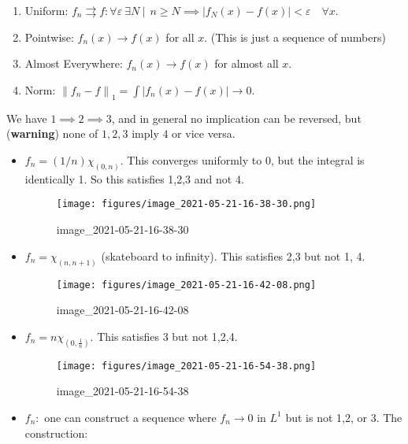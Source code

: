 \begin{proposition}

\envlist

\begin{enumerate}
\def\labelenumi{\arabic{enumi}.}
\tightlist
\item
  Uniform:
  \(f_n \rightrightarrows f: \forall \varepsilon ~\exists N {~\mathrel{\Big|}~}~n\geq N \implies {\left\lvert {f_N(x) - f(x)} \right\rvert} < \varepsilon \quad \forall x.\)
\item
  Pointwise: \(f_n(x) \to f(x)\) for all \(x\). (This is just a sequence
  of numbers)
\item
  Almost Everywhere: \(f_n(x) \to f(x)\) for almost all \(x\).
\item
  Norm:
  \({\left\lVert {f_n - f} \right\rVert}_1 = \int {\left\lvert {f_n(x) - f(x)} \right\rvert} \to 0\).
\end{enumerate}

We have \(1 \implies 2 \implies 3\), and in general no implication can
be reversed, but (\textbf{warning}) none of \(1,2,3\) imply \(4\) or
vice versa.

\begin{itemize}
\item
  \(f_n = (1/n) \chi_{(0, n)}\). This converges uniformly to 0, but the
  integral is identically 1. So this satisfies 1,2,3 and not 4.

  \begin{figure}
  \centering
  \texttt{[image: figures/image\_2021-05-21-16-38-30.png]}
  \caption{image\_2021-05-21-16-38-30}
  \end{figure}
\item
  \(f_n = \chi_{(n, n+1)}\) (skateboard to infinity). This satisfies 2,3
  but not 1, 4.

  \begin{figure}
  \centering
  \texttt{[image: figures/image\_2021-05-21-16-42-08.png]}
  \caption{image\_2021-05-21-16-42-08}
  \end{figure}
\item
  \(f_n = n\chi_{(0, \frac 1 n)}\). This satisfies 3 but not 1,2,4.

  \begin{figure}
  \centering
  \texttt{[image: figures/image\_2021-05-21-16-54-38.png]}
  \caption{image\_2021-05-21-16-54-38}
  \end{figure}
\item
  \(f_n:\) one can construct a sequence where \(f_n \to 0\) in \(L^1\)
  but is not 1,2, or 3. The construction:


\end{itemize}
\end{proposition}
